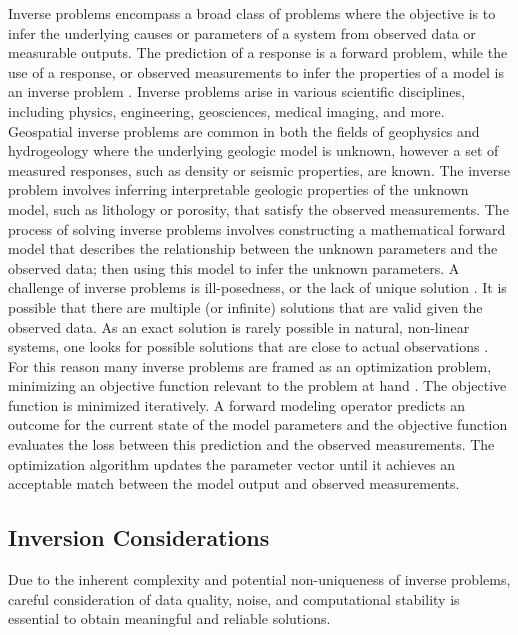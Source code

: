 Inverse problems encompass a broad class of problems where the objective is to infer the underlying causes or parameters of a system from observed data or measurable outputs. The prediction of a response is a forward problem, while the use of a response, or observed measurements to infer the properties of a model is an inverse problem \citep{tarantola2005inverse}. Inverse problems arise in various scientific disciplines, including physics, engineering, geosciences, medical imaging, and more. Geospatial inverse problems are common in both the fields of geophysics \citep{linde2015geological} and hydrogeology \citep{zhou2014inverse} where the underlying geologic model is unknown, however a set of measured responses, such as density or seismic properties, are known. The inverse problem involves inferring interpretable geologic properties of the unknown model, such as lithology or porosity, that satisfy the observed measurements. The process of solving inverse problems involves constructing a mathematical forward model that describes the relationship between the unknown parameters and the observed data; then using this model to infer the unknown parameters. A challenge of inverse problems is ill-posedness, or the lack of unique solution \citep{tarantola2005inverse}. It is possible that there are multiple (or infinite) solutions that are valid given the observed data. As an exact solution is rarely possible in natural, non-linear systems, one looks for possible solutions that are close to actual observations \citep{bardossy2016random}. For this reason many inverse problems are framed as an optimization problem, minimizing an objective function relevant to the problem at hand \citep{giraud2019integration,nava-flores2023high,athens2022stochastic}. The objective function is minimized iteratively. A forward modeling operator predicts an outcome for the current state of the model parameters and the objective function evaluates the loss between this prediction and the observed measurements. The optimization algorithm updates the parameter vector until it achieves an acceptable match between the model output and observed measurements.

\subsection{Inversion Considerations}
\label{subsec:03invconsider}

Due to the inherent complexity and potential non-uniqueness of inverse problems, careful consideration of data quality, noise, and computational stability is essential to obtain meaningful and reliable solutions.

